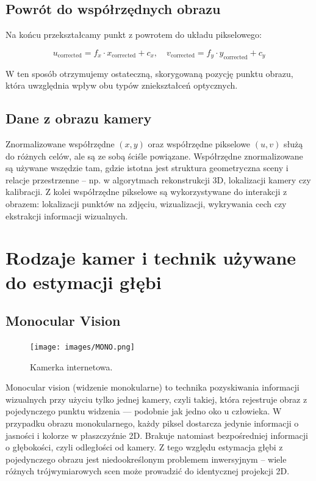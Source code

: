 \documentclass[magisterska]{pracadypl}
\begin{document}
\subsection*{Powrót do współrzędnych obrazu}

Na końcu przekształcamy punkt z powrotem do układu pikselowego:

\[
u_{\text{corrected}} = f_x \cdot x_{\text{corrected}} + c_x, \quad
v_{\text{corrected}} = f_y \cdot y_{\text{corrected}} + c_y
\]

W ten sposób otrzymujemy ostateczną, skorygowaną pozycję punktu obrazu, która uwzględnia wpływ obu typów zniekształceń optycznych.

\subsection{Dane z obrazu kamery}

Znormalizowane współrzędne $(x, y)$ oraz współrzędne pikselowe $(u, v)$ służą do różnych celów, ale są ze sobą ściśle powiązane. Współrzędne znormalizowane są używane wszędzie tam, gdzie istotna jest struktura geometryczna sceny i relacje przestrzenne – np. w algorytmach rekonstrukcji 3D, lokalizacji kamery czy kalibracji. Z kolei współrzędne pikselowe są wykorzystywane do interakcji z obrazem: lokalizacji punktów na zdjęciu, wizualizacji, wykrywania cech czy ekstrakcji informacji wizualnych.

\section{Rodzaje kamer i technik używane do estymacji głębi}

\subsection{Monocular Vision}

\begin{figure}[H]  %
    \centering  %
    \texttt{[image: images/MONO.png]}  %
    \captionsetup{font=footnotesize}
    \caption[Kamerka internetowa. https://cell-kom.com/inne/21454-kamera-internetowa-full-hd-b16-1080p-5900217390350.html]{Kamerka internetowa.}
    \label{fig:mono}  %
\end{figure}

Monocular vision (widzenie monokularne) to technika pozyskiwania informacji wizualnych przy użyciu tylko jednej kamery, czyli takiej, która rejestruje obraz z pojedynczego punktu widzenia — podobnie jak jedno oko u człowieka.
W przypadku obrazu monokularnego, każdy piksel dostarcza jedynie informacji o jasności i kolorze w płaszczyźnie 2D. Brakuje natomiast bezpośredniej informacji o głębokości, czyli odległości od kamery. Z tego względu estymacja głębi z pojedynczego obrazu jest niedookreślonym problemem inwersyjnym – wiele różnych trójwymiarowych scen może prowadzić do identycznej projekcji 2D.
\end{document}
